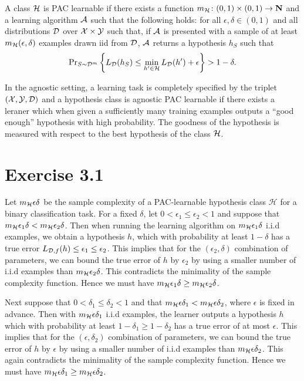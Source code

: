 \begin{definition}
A class $\mathcal{H}$ is PAC learnable if there exists a function $m_{\mathcal{H}}
\colon (0, 1) \times (0, 1) \rightarrow \mathbf{N}$ and a learning algorithm $\mathcal{A}$
such that the following holds: for all $\epsilon, \delta \in (0, 1)$ and all
distributions $\mathcal{D}$ over $\mathcal{X} \times \mathcal{Y}$ such that, if $\mathcal{A}$ is
presented with a sample of at least $m_{\mathcal{H}}(\epsilon, \delta)$ examples
drawn iid from $\mathcal{D}$, $\mathcal{A}$ returns a hypothesis $h_S$ such that
\[
   \text{Pr}_{S \sim \mathcal{D}^m} \left \{ L_{\mathcal{D}} (h_S) \leq 
        \min_{h' \in \mathcal{H}} L_{\mathcal{D}} (h') + \epsilon \right \} > 1 - \delta.
\]
\end{definition}
In the agnostic setting, a learning task is completely specified by the triplet 
$(\mathcal{X}, \mathcal{Y}, \mathcal{D})$ and a hypothesis class is agnostic PAC learnable if 
there exists a leraner which when given a sufficiently many training examples 
outputs a ``good enough'' hypothesis with high probability. The goodness of the 
hypothesis is measured with respect to the best hypothesis of the class $\mathcal{H}$. 

\section*{Exercise 3.1}

Let $m_{\mathcal{H}}{\epsilon}{\delta}$ be the sample complexity of a PAC-learnable hypothesis class 
$\mathcal{H}$ for a binary classification task. For a fixed $\delta$, let 
$0 < \epsilon_1 \leq \epsilon_2 < 1$ and suppose that 
$m_{\mathcal{H}}{\epsilon_1}{\delta} < m_{\mathcal{H}}{\epsilon_2}{\delta}$. Then when 
running the learning algorithm on $m_{\mathcal{H}}{\epsilon_1}{\delta}$ i.i.d examples, 
we obtain a hypothesis $h$, which with probability at least $1 - \delta$ has 
a true error $L_{\mathcal{D}, f}(h) \leq \epsilon_1 \leq \epsilon_2$. This
implies that for the $(\epsilon_2, \delta)$ combination of parameters, we can bound 
the true error of $h$ by $\epsilon_2$ by using a smaller number of i.i.d examples 
than $m_{\mathcal{H}}{\epsilon_2}{\delta}$. This contradicts
the minimality of the sample complexity function. Hence we must have 
$m_{\mathcal{H}}{\epsilon_1}{\delta} \geq m_{\mathcal{H}}{\epsilon_2}{\delta}$.

Next suppose that $0 < \delta_1 \leq \delta_2 < 1$ and that 
$m_{\mathcal{H}}{\epsilon}{\delta_1} < m_{\mathcal{H}}{\epsilon}{\delta_2}$, where $\epsilon$
is fixed in advance. Then with $m_{\mathcal{H}}{\epsilon}{\delta_1}$ i.i.d examples, the
learner outputs a hypothesis $h$ which with probability at least 
$1 - \delta_1 \geq 1 - \delta_2$ has a true error of at most $\epsilon$. This
implies that for the $(\epsilon, \delta_2)$ combination of parameters, we can bound 
the true error of $h$ by $\epsilon$ by using a smaller number of i.i.d examples 
than $m_{\mathcal{H}}{\epsilon}{\delta_2}$. This again contradicts
the minimality of the sample complexity function. Hence we must have 
$m_{\mathcal{H}}{\epsilon}{\delta_1} \geq m_{\mathcal{H}}{\epsilon}{\delta_2}$.

